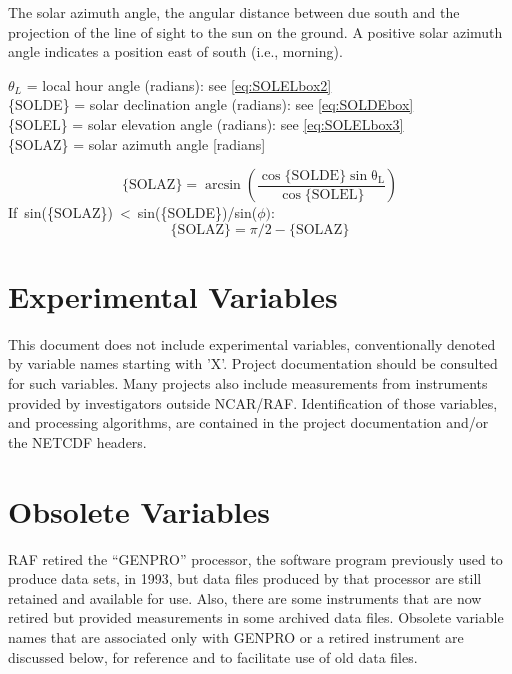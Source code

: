 \documentclass[
]{book}
\begin{document}
The solar azimuth angle, the angular distance between due south and the projection of the line of sight to the sun on the ground. A positive solar azimuth angle indicates a position east of south (i.e., morning).

\(\theta_{L}\) = local hour angle (radians): see \eqref{eq:SOLELbox2}\\
\{SOLDE\} = solar declination angle (radians): see \eqref{eq:SOLDEbox}\\
\{SOLEL\} = solar elevation angle (radians): see \eqref{eq:SOLELbox3}\\
\{SOLAZ\} = solar azimuth angle {[}radians{]}

\begin{equation}
\mathrm{\{SOLAZ\}=\arcsin\left(\frac{\cos\mathrm{\{SOLDE\}\sin\theta_{L}}}{\cos\mathrm{\{SOLEL\}}}\right)}
\label{eq:SOLAZbox1}
\end{equation}
If~sin(\{SOLAZ\})~\textless~sin(\{SOLDE\})/sin(\(\phi):\)\\
\begin{equation}
\mathrm{\{SOLAZ\}} = \pi/2-\mathrm{\{SOLAZ\}}
\label{eq:SOLAZbox2}
\end{equation}

\hypertarget{experimental-variables}{%
\chapter{Experimental Variables}\label{experimental-variables}}

This document does not include experimental variables, conventionally denoted by variable names starting with 'X'. Project documentation should be consulted for such variables. Many projects also include measurements from instruments provided by investigators outside NCAR/RAF. Identification of those variables, and processing algorithms, are contained in the project documentation and/or the NETCDF headers.

\hypertarget{obsolete-variables}{%
\chapter{Obsolete Variables}\label{obsolete-variables}}

RAF retired the ``GENPRO'' processor, the software program previously used to produce data sets, in 1993, but data files produced by that processor are still retained and available for use. Also, there are some instruments that are now retired but provided measurements in some archived data files. Obsolete variable names that are associated only with GENPRO or a retired instrument are discussed below, for reference and to facilitate use of old data files.
\end{document}
